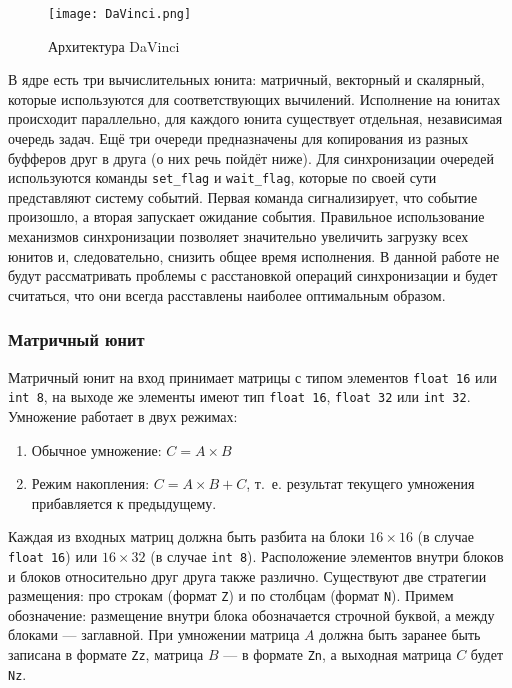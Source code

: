 \begin{figure}[h!]
    \centering
    \texttt{[image: DaVinci.png]}
    \caption{Архитектура DaVinci}
\end{figure}

В ядре есть три вычислительных юнита: матричный, векторный и скалярный,
которые используются для соответствующих вычилений.  Исполнение на юнитах
происходит параллельно, для каждого юнита существует
отдельная, независимая очередь задач. Ещё три очереди предназначены для
копирования из разных буфферов друг в друга (о них речь пойдёт ниже).
Для синхронизации очередей используются команды \texttt{set\_flag} и \texttt{wait\_flag},
которые по своей сути представляют систему событий. Первая команда сигнализирует,
что событие произошло, а вторая запускает ожидание события. Правильное
использование механизмов синхронизации позволяет значительно увеличить
загрузку всех юнитов и, следовательно, снизить общее время исполнения.
В данной работе не будут рассматривать проблемы с расстановкой операций
синхронизации и будет считаться, что они всегда расставлены наиболее
оптимальным образом.

\subsubsection{Матричный юнит}

Матричный юнит на вход принимает матрицы с типом элементов \texttt{float 16}
или \texttt{int 8}, на выходе же элементы имеют тип \texttt{float 16},
\texttt{float 32} или \texttt{int 32}. Умножение работает в двух режимах:

\begin{enumerate}
    \item Обычное умножение: $C = A \times B$
    \item Режим накопления: $C = A \times B + C$, т.~е. результат текущего
          умножения прибавляется к предыдущему.
\end{enumerate}

Каждая из входных матриц должна быть разбита на блоки $16 \times 16$
(в случае \texttt{float 16}) или $16 \times 32$ (в случае \texttt{int 8}).
Расположение элементов внутри блоков и блоков относительно друг друга также
различно. Существуют две стратегии размещения: про строкам (формат \texttt{Z})
и по столбцам (формат \texttt{N}). Примем обозначение: размещение внутри блока
обозначается строчной буквой, а между блоками --- заглавной. При умножении
матрица $A$ должна быть заранее быть записана в формате \texttt{Zz},
матрица $B$ --- в формате \texttt{Zn}, а выходная матрица $C$ будет \texttt{Nz}.

